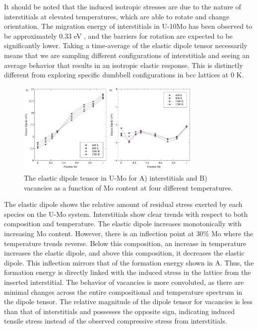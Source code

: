 \documentclass[review]{elsarticle}
\begin{document}
It should be noted that the induced isotropic stresses are due to the nature of interstitials at elevated temperatures, which are able to rotate and change orientation. The migration energy of interstitials in U-10Mo has been observed to be approximately 0.33 eV \cite{Jin2021}, and the barriers for rotation are expected to be significantly lower. Taking a time-average of the elastic dipole tensor necessarily means that we are sampling different configurations of interstitials and seeing an average behavior that results in an isotropic elastic response. This is distinctly different from exploring specific dumbbell configurations in bcc lattices at 0 K. 

\begin{figure}[h!]
    \centering
    \includegraphics[width=0.8\textwidth]{dipole1.pdf}
    \caption{The elastic dipole tensor in U-Mo for A) interstitials and B) vacancies as a function of Mo content at four different temperatures.}
    \label{fig:dipole}
\end{figure}

The elastic dipole shows the relative amount of residual stress exerted by each species on the U-Mo system. Interstitials show clear trends with respect to both composition and temperature. The elastic dipole increases monotonically with increasing Mo content. However, there is an inflection point at 30\% Mo where the temperature trends reverse. Below this composition, an increase in temperature increases the elastic dipole, and above this composition, it decreases the elastic dipole. This inflection mirrors that of the formation energy shown in A. Thus, the formation energy is directly linked with the induced stress in the lattice from the inserted interstitial. The behavior of vacancies is more convoluted, as there are minimal changes across the entire compositional and temperature spectrum in the dipole tensor. The relative magnitude of the dipole tensor for vacancies is less than that of interstitials and possesses the opposite sign, indicating induced tensile stress instead of the observed compressive stress from interstitials. 
\end{document}

